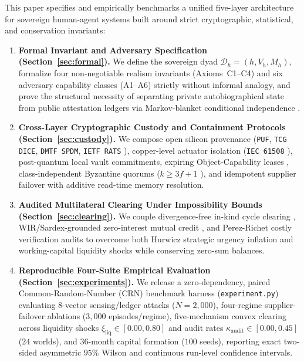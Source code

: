 \documentclass[11pt]{article}
\begin{document}
This paper specifies and empirically benchmarks a unified five-layer architecture for sovereign human-agent systems built around strict cryptographic, statistical, and conservation invariants:
\begin{enumerate}
  \item \textbf{Formal Invariant and Adversary Specification (Section~\ref{sec:formal}).} We define the sovereign dyad $\mathcal{D}_h = (h, V_h, M_h)$, formalize four non-negotiable realism invariants (Axioms~C1--C4) and six adversary capability classes (A1--A6) strictly without informal analogy, and prove the structural necessity of separating private autobiographical state from public attestation ledgers via Markov-blanket conditional independence \citep{friston2013life}.
  \item \textbf{Cross-Layer Cryptographic Custody and Containment Protocols (Section~\ref{sec:custody}).} We compose open silicon provenance (\texttt{PUF}, \texttt{TCG DICE}, \texttt{DMTF SPDM}, \texttt{IETF RATS} \citep{birkholz2023rats}), copper-level actuator isolation (\texttt{IEC 61508} \citep{leveson2011engineering}), post-quantum local vault commitments, expiring Object-Capability leases \citep{dennis1966programming, necula1997pcc}, class-independent Byzantine quorums ($k \ge 3f+1$ \citep{lamport1982byzantine}), and idempotent supplier failover with additive read-time memory resolution.
  \item \textbf{Audited Multilateral Clearing Under Impossibility Bounds (Section~\ref{sec:clearing}).} We couple divergence-free in-kind cycle clearing \citep{fleischman2026cycles}, WIR/Sardex-grounded zero-interest mutual credit \citep{stodder2009wir, iosifidis2018sardex}, and Perez-Richet costly verification audits \citep{perezrichet2022falsification, becker1968crime} to overcome both Hurwicz strategic urgency inflation and working-capital liquidity shocks while conserving zero-sum balances.
  \item \textbf{Reproducible Four-Suite Empirical Evaluation (Section~\ref{sec:experiments}).} We release a zero-dependency, paired Common-Random-Number (CRN) benchmark harness (\texttt{experiment.py}) evaluating 8-vector sensing/ledger attacks ($N=2{,}000$), four-regime supplier-failover ablations ($3{,}000$ episodes/regime), five-mechanism convex clearing across liquidity shocks $\xi_{\mathrm{liq}} \in [0.00, 0.80]$ and audit rates $\kappa_{\mathrm{audit}} \in [0.00, 0.45]$ ($24$ worlds), and 36-month capital formation ($100$ seeds), reporting exact two-sided asymmetric $95\%$ Wilson \citep{wilson1927probable} and continuous run-level confidence intervals.
\end{enumerate}
\end{document}
